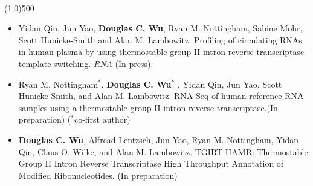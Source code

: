 \documentclass[dvips,11pt]{article}
\begin{document}
\bigskip 
{} \vspace{-1.5mm}
\\\noindent
\line(1,0){500}\\
 \vspace{-6mm}
\begin{itemize} 
	\setlength{\itemsep}{0pt}
				\item Yidan Qin, Jun Yao, {\bf Douglas C. Wu}, Ryan M. Nottingham, Sabine Mohr, Scott Hunicke-Smith and Alan M. Lambowitz. Profiling of circulating RNAs in human plasma by using thermostable group II intron reverse transcriptase template switching. {\it RNA} (In press).
				\item Ryan M. Nottingham$^*$, {\bf Douglas C. Wu$^*$} , Yidan Qin, Jun Yao, Scott Hunicke-Smith, and Alan M. Lambowitz. RNA-Seq of human reference RNA samples using a thermostable group II intron reverse transcriptase.(In preparation) ($^*$co-first author)
				\item {\bf Douglas C. Wu}, Alfread Lentzsch, Jun Yao, Ryan M. Nottingham, Yidan Qin, Claus O. Wilke, and Alan M. Lambowitz. TGIRT-HAMR: Thermostable Group II Intron Reverse Transcriptase High Throughput Annotation of Modified Ribonucleotides. (In preparation)
\end{itemize}
\end{document}
